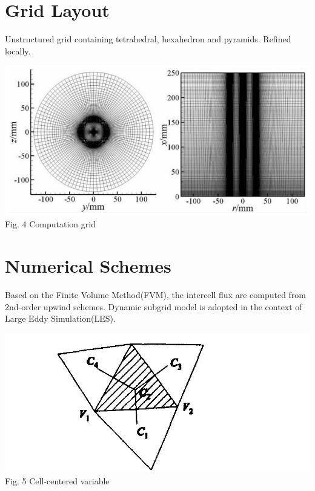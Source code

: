 \documentclass[a0,portrait]{a0poster}
\begin{document}
\begin{multicols}{2}
\section*{Grid Layout}
	\vspace{-0.5cm}
	\color{DarkSlateGray}
	Unstructured grid containing tetrahedral, hexahedron and pyramids. Refined locally.
	\vspace{0.5cm}
	\begin{center}
		\vspace{-0.5cm}
		\includegraphics[width=0.55\linewidth]{pic/grid.png}\\
		\vspace{-0.5cm}
		{\color{Green} Fig. 4 Computation grid}
	\end{center}

\color{SaddleBrown}
\section*{Numerical Schemes}
	\vspace{-0.5cm}
	\color{DarkSlateGray}
	Based on the Finite Volume Method(FVM), the intercell flux are computed from 2nd-order upwind schemes. Dynamic subgrid model is adopted in the context of Large Eddy Simulation(LES).

	\setlength\columnseprule{0pt}
	\begin{multicols}{2}
		\color{DarkSlateGray}
		\begin{center}
			\includegraphics[width=\linewidth]{pic/cell.jpg}\\
			\vspace{0.5cm}
			{\color{Green} Fig. 5 Cell-centered variable}
		\end{center}
		

\end{multicols}
\end{multicols}
\end{document}
